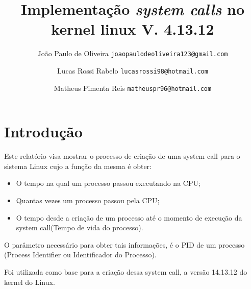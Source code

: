 \documentclass[12pt]{article}
\begin{document}
\title{Implementação \textit{system calls} no kernel linux V. 4.13.12\vspace{3.5cm}} %

\author{
	João Paulo de Oliveira
	\texttt{joaopaulodeoliveira123@gmail.com}
	\and
	Lucas Rossi Rabelo
	\texttt{lucasrossi98@hotmail.com}
	\and		
	Matheus Pimenta Reis
	\texttt{matheuspr96@hotmail.com}
	\vspace*{9cm}
}

\maketitle

\tableofcontents
\pagebreak
\section{Introdução}
Este relatório visa mostrar o processo de criação de uma system call para o sistema Linux cujo a função da mesma é obter:

\begin{itemize}

\item O tempo na qual um processo passou executando na CPU;
\item Quantas vezes um processo passou pela CPU;
\item O tempo desde a criação de um processo até o momento de execução da system call(Tempo de vida do processo).

\end{itemize}

O parâmetro necessário para obter tais informações, é o PID de um processo (Process Identifier ou Identificador do Processo).

Foi utilizada como base para a criação dessa system call, a versão 14.13.12 do kernel do Linux.
\end{document}
